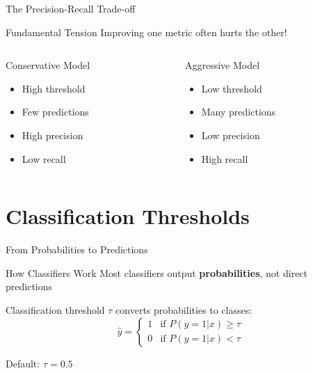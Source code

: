 \documentclass{beamer}
\begin{document}
\begin{frame}{The Precision-Recall Trade-off}
\begin{keypointsbox}{Fundamental Tension}
Improving one metric often hurts the other!
\end{keypointsbox}

\vspace{0.5cm}

\begin{columns}
\begin{column}{0.48\textwidth}
\begin{block}{Conservative Model}
\begin{itemize}
    \item High threshold
    \item Few predictions
    \item High precision
    \item Low recall
\end{itemize}
\end{block}
\end{column}

\begin{column}{0.48\textwidth}
\begin{block}{Aggressive Model}
\begin{itemize}
    \item Low threshold
    \item Many predictions
    \item Low precision
    \item High recall
\end{itemize}
\end{block}
\end{column}
\end{columns}
\end{frame}

\section{Classification Thresholds}

\begin{frame}{From Probabilities to Predictions}
\begin{definitionbox}{How Classifiers Work}
Most classifiers output \textbf{probabilities}, not direct predictions

\vspace{0.3cm}

Classification threshold $\tau$ converts probabilities to classes:
$$\hat{y} = \begin{cases}
1 & \text{if } P(y=1|x) \geq \tau \\
0 & \text{if } P(y=1|x) < \tau
\end{cases}$$

Default: $\tau = 0.5$
\end{definitionbox}
\end{frame}
\end{document}
